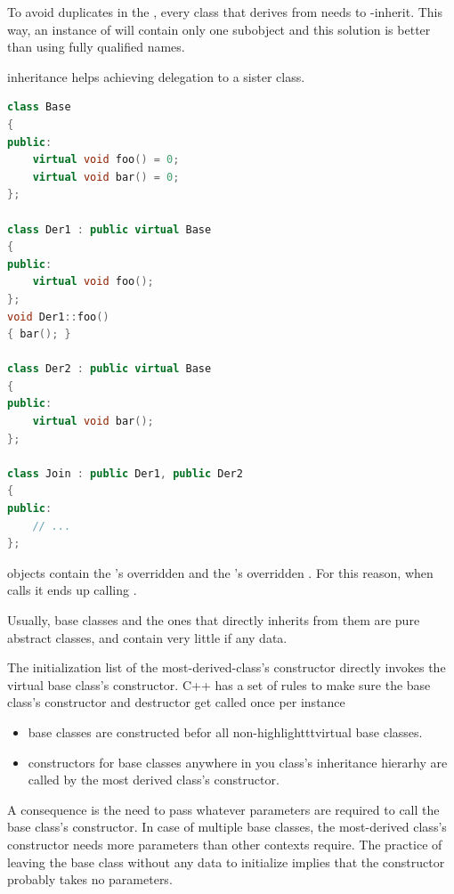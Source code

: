 To avoid duplicates in the , every class that 
derives from  needs to -inherit. 
This way, an instance of  will contain only one 
 subobject and this solution is better than using 
fully qualified names.

\clearpage
{}
 inheritance helps achieving delegation to a 
sister class.
\begin{lstlisting}[language=C++]
class Base
{
public:
    virtual void foo() = 0;
    virtual void bar() = 0;
};

class Der1 : public virtual Base
{
public:
    virtual void foo();
};
void Der1::foo()
{ bar(); }

class Der2 : public virtual Base
{
public:
    virtual void bar();
};

class Join : public Der1, public Der2
{
public:
    // ...
};
\end{lstlisting}
 objects contain the 's overridden 
 and the 's overridden 
. For this reason, when  
calls  it ends up calling 
.

\vspace{-1cm}
Usually,  base classes and the ones that directly 
inherits from them are pure abstract classes, and contain very little 
if any data.

The initialization list of the most-derived-class's constructor directly 
invokes the virtual base class's constructor.
\newline
C++ has a set of rules to make sure the  base 
class's constructor and destructor get called once per instance
\begin{itemize}
    \item {} base classes are constructed befor all 
    non-highlighttt{virtual} base classes.
    \item constructors for  base classes anywhere 
    in you class's inheritance hierarhy are called by the most derived 
    class's constructor.
\end{itemize}
A consequence is the need to pass whatever parameters are required to call 
the  base class's constructor. In case of multiple 
 base classes, the most-derived class's constructor 
needs more parameters than other contexts require.
\newline
The practice of leaving the  base class without any 
data to initialize implies that the constructor probably takes no 
parameters.

